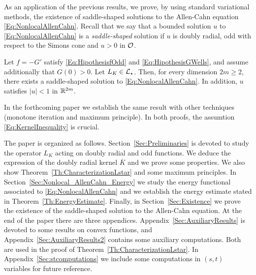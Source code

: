 As an application of the previous results, we prove, by using standard variational methods, the existence of saddle-shaped solutions to the Allen-Cahn equation \eqref{Eq:NonlocalAllenCahn}. Recall that we say that a bounded solution $u$ to \eqref{Eq:NonlocalAllenCahn} is a \emph{saddle-shaped} solution if $u$ is doubly radial, odd with respect to the Simons cone and $u>0$ in $\mathcal{O}$. 

\begin{theorem}
	\label{Th:Existence}
    Let $f=-G'$ satisfy \eqref{Eq:HipothesisfOdd} and \eqref{Eq:HipothesisGWells}, and assume additionally that $G(0)>0$. Let $L_K\in \mathcal{L}_\star$. Then, for every dimension $2m \geq 2$, there exists a saddle-shaped solution to \eqref{Eq:NonlocalAllenCahn}. In addition, $u$ satisfies $|u|<1$ in $\mathbb{R}^{2m}$.
\end{theorem}

In the forthcoming paper \cite{FelipeSanz-Perela:IntegroDifferentialII} we establish the same result with other techniques (monotone iteration and maximum principle). In both proofs, the assumtion \eqref{Eq:KernelInequality} is crucial.


 The paper is organized as follows. Section~\ref{Sec:Preliminaries} is devoted to study the operator $L_K$ acting on doubly radial and odd functions. We deduce the expression of the doubly radial kernel $\overline{K}$ and we prove some properties. We also show Theorem~\ref{Th:CharacterizationLstar} and some maximum principles. In Section~\ref{Sec:Nonlocal_AllenCahn_Energy} we study the energy functional associated to \eqref{Eq:NonlocalAllenCahn} and we establish the energy estimate stated in Theorem~\ref{Th:EnergyEstimate}. Finally, in Section~\ref{Sec:Existence} we prove the existence of the saddle-shaped solution to the Allen-Cahn equation. At the end of the paper there are three appendices. Appendix~\ref{Sec:AuxiliaryResults} is devoted to some results on convex functions, and Appendix~\ref{Sec:AuxiliaryResults2} contains some auxiliary computations. Both are used in the proof of Theorem~\ref{Th:CharacterizationLstar}. In Appendix~\ref{Sec:stcomputations} we include some computations in $(s,t)$ variables for future reference.